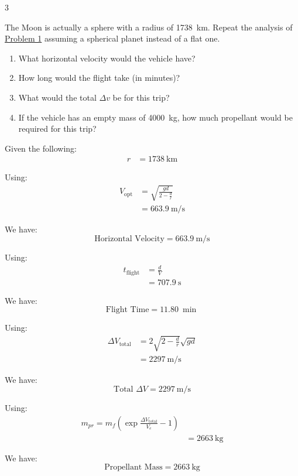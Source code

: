 \begin{hwkProblem*}{3}{} \label{hwk:p03}

	The Moon is actually a sphere with a radius of \qty{1738}{\km}. Repeat the analysis of \hyperref[hwk:p01]{Problem 1} assuming a spherical planet instead of a flat one.
	\begin{enumerate}[label=\alph*.]
		\item \label{hwk:p03a} What horizontal velocity would the vehicle have?
		\item \label{hwk:p03b} How long would the flight take (in minutes)?
		\item \label{hwk:p03c} What would the total \( \Delta v \) be for this trip?
		\item \label{hwk:p03d} If the vehicle has an empty mass of \qty{4000}{\kg}, how much propellant would be required for this trip?
	\end{enumerate}

	\hwkSol{} \label{hwk:s03}

	Given the following:
	\begin{align*}
		r &= \qty{1738}{\km}
	\end{align*}

	\hwkPart{} \label{hwk:s03a}

	Using:
	\begin{align*}
		V_{\text{opt}} &= \sqrt{\frac{gd}{2 - \frac{d}{r}}} \\
		\, &= \qty{663.9}{\m\per\s}
	\end{align*}

	We have:
	\[
		\boxed{\text{Horizontal Velocity} = \qty{663.9}{\m\per\s}}
	\]

	\hwkPart{} \label{hwk:s03b}

	Using:
	\begin{align*}
		t_{\text{flight}} &= \frac{d}{V} \\
		\, &= \qty{707.9}{\s}
	\end{align*}

	We have:
	\[
		\boxed{\text{Flight Time} = \qty{11.80}{\min}}
	\]

	\hwkPart{} \label{hwk:s03c}

	Using:
	\begin{align*}
		\Delta V_{\text{total}} &= 2 \sqrt{2 - \frac{d}{r}} \sqrt{gd} \\
		\, &= \qty{2297}{\m\per\s}
	\end{align*}

	We have:
	\[
		\boxed{\text{Total } \Delta V = \qty{2297}{\m\per\s}}
	\]

	\hwkPart{} \label{hwk:s03d}

	Using:
	\begin{align*}
		m_{pr} = m_{f} \left(\exp{\frac{\Delta V_{\text{total}}}{V_{e}}} - 1\right) \\
		\, &= \qty{2663}{\kg}
	\end{align*}

	We have:
	\[
		\boxed{\text{Propellant Mass} = \qty{2663}{\kg}}
	\]

\end{hwkProblem*}

